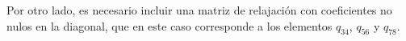 Por otro lado, es necesario incluir una matriz de relajaci\'on con coeficientes no nulos en la diagonal, que en este caso corresponde a los elementos $q_{34}$, $q_{56}$ y $q_{78}$.


